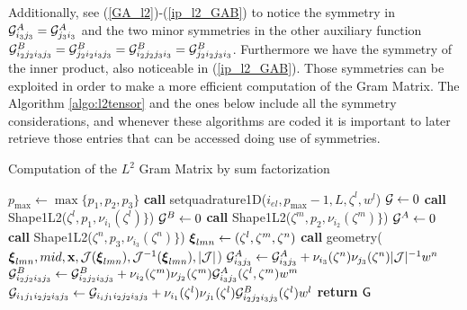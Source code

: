 Additionally, see (\ref{GA_l2})-(\ref{ip_l2_GAB}) to notice the symmetry in $\mathcal{G}_{i_3j_3}^A=\mathcal{G}_{j_3i_3}^A$ and the two minor symmetries in the other auxiliary function $\mathcal{G}_{i_2j_2i_3j_3}^B=\mathcal{G}_{j_2i_2i_3j_3}^B=\mathcal{G}_{i_2j_2j_3i_3}^B=\mathcal{G}_{j_2i_2j_3i_3}^B$. Furthermore we have the symmetry of the inner product, also noticeable in (\ref{ip_l2_GAB}). Those symmetries can be exploited in order to make a more efficient computation of the Gram Matrix. The Algorithm \ref{algo:l2tensor} and the ones below include all the symmetry considerations, and whenever these algorithms are coded it is important to later retrieve those entries that can be accessed doing use of symmetries.

\begin{algorithm}[ht]
\caption{Computation of the $L^2$ Gram Matrix by sum factorization}\label{algo:l2tensor}
\begin{algorithmic}
\State $p_{\max}\gets\max\{p_1,p_2,p_3\}$
\State\textbf{call }setquadrature1D($i_{el},p_{\max}-1,L,\zeta^l,w^l$)
\State $\mathcal{G}\gets 0$
    \State\textbf{call } Shape1L2($\zeta^l,p_1,\nu_{i_1}(\zeta^l)\}$) 
            \State $\mathcal{G}^B\gets 0$
                \State\textbf{call } Shape1L2($\zeta^m,p_2,\nu_{i_2}(\zeta^m)\}$) 
                \State $\mathcal{G}^A\gets 0$
                    \State\textbf{call } Shape1L2($\zeta^n,p_3,\nu_{i_3}(\zeta^n)\}$) 
                    \State $\boldsymbol{\xi}_{lmn}\gets (\zeta^l,\zeta^m,\zeta^n)$
                    \State\textbf{call } geometry( $\boldsymbol{\xi}_{lmn},mid,\mathbf{x},\mathcal{J}(\boldsymbol{\xi}_{lmn}),\mathcal{J}^{-1}(\boldsymbol{\xi}_{lmn}),|\mathcal{J}|$)
                    \State$\mathcal{G}_{i_3j_3}^A\gets \mathcal{G}_{i_3j_3}^A+ \nu_{i_3}(\zeta^n)\nu_{j_3}(\zeta^n)|\mathcal{J}|^{-1}w^n$ 
                \EndFor
                        \State$\mathcal{G}_{i_2j_2i_3j_3}^B\gets \mathcal{G}_{i_2j_2i_3j_3}^B+ \nu_{i_2}(\zeta^m)\nu_{j_2}(\zeta^m)\mathcal{G}_{i_3j_3}^A(\zeta^l,\zeta^m)w^m$ 
                    \EndFor
                \EndFor
            \EndFor
                            \State $\mathcal{G}_{i_1j_1i_2j_2i_3j_3}\gets \mathcal{G}_{i_ij_1i_2j_2i_3j_3}+ \nu_{i_1}(\zeta^l)\nu_{j_1}(\zeta^l)\mathcal{G}_{i_2j_2i_3j_3}^B(\zeta^l)w^l$ 
                        \EndFor
                    \EndFor
                \EndFor
            \EndFor
        \EndFor
    \EndFor
\EndFor
\State \textbf{return} $\mathsf{G}$
\EndProcedure
\end{algorithmic}
\end{algorithm}

